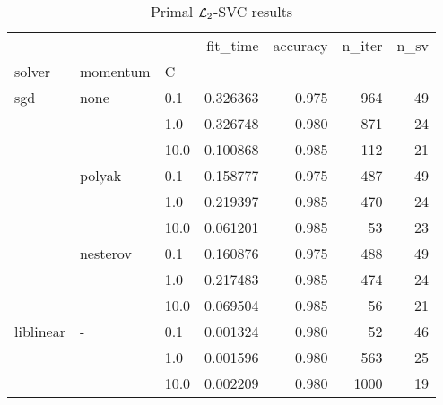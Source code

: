 \begin{table}[H]
\centering
\caption{Primal $\protect \mathcal{L}_2$-SVC results}
\label{primal_l2_svc_cv_results}
\begin{tabular}{lllrrrr}
\toprule
          &   &      &  fit\_time &  accuracy &  n\_iter &  n\_sv \\
solver & momentum & C &           &           &         &       \\
\midrule
sgd & none & 0.1  &  0.326363 &     0.975 &     964 &    49 \\
          &   & 1.0  &  0.326748 &     0.980 &     871 &    24 \\
          &   & 10.0 &  0.100868 &     0.985 &     112 &    21 \\
          & polyak & 0.1  &  0.158777 &     0.975 &     487 &    49 \\
          &   & 1.0  &  0.219397 &     0.985 &     470 &    24 \\
          &   & 10.0 &  0.061201 &     0.985 &      53 &    23 \\
          & nesterov & 0.1  &  0.160876 &     0.975 &     488 &    49 \\
          &   & 1.0  &  0.217483 &     0.985 &     474 &    24 \\
          &   & 10.0 &  0.069504 &     0.985 &      56 &    21 \\
liblinear & - & 0.1  &  0.001324 &     0.980 &      52 &    46 \\
          &   & 1.0  &  0.001596 &     0.980 &     563 &    25 \\
          &   & 10.0 &  0.002209 &     0.980 &    1000 &    19 \\
\bottomrule
\end{tabular}
\end{table}
